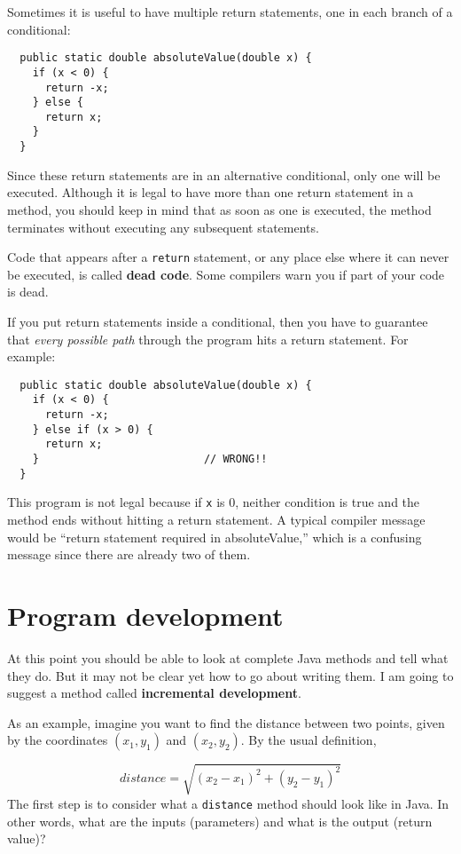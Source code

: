 \documentclass[12pt]{book}
\theoremstyle{definition}
\begin{document}
Sometimes it is useful to have multiple return
statements, one in each branch of a conditional:

\begin{lstlisting}
  public static double absoluteValue(double x) {
    if (x < 0) {
      return -x;
    } else {
      return x;
    }
  }
\end{lstlisting}
%
Since these return statements are in an alternative conditional,
only one will be executed.  Although it is legal to have more than one
return statement in a method, you should keep in mind
that as soon as one is executed, the method
terminates without executing any subsequent statements.

Code that appears after a {\tt return} statement, or any place else
where it can never be executed, is called {\bf dead code}.  Some
compilers warn you if part of your code is dead.


If you put return statements inside a conditional, then
you have to guarantee that {\em every possible path} through
the program hits a return statement.  For example:

\begin{lstlisting}
  public static double absoluteValue(double x) {
    if (x < 0) {
      return -x;
    } else if (x > 0) {
      return x;
    }                          // WRONG!!
  }
\end{lstlisting}
%
This program is not legal because if {\tt x} is 0,
neither condition is true and the method ends without hitting
a return statement.  A typical compiler message would be ``return
statement required in absoluteValue,'' which is a confusing message
since there are already two of them.


\section{Program development}
\label{distance}

At this point you should be able to look at complete Java methods and
tell what they do.  But it may not be clear yet how to go about
writing them.  I am going to suggest a method called {\bf incremental
  development}.

As an example, imagine you want to find the distance between
two points, given by the coordinates $(x_1, y_1)$ and
$(x_2, y_2)$.  By the usual definition,

\begin{equation}
distance = \sqrt{(x_2 - x_1)^2 +(y_2 - y_1)^2}
\end{equation}
%
The first step is to consider what a {\tt distance} method
should look like in Java.  In other words, what are the inputs
(parameters) and what is the output (return value)?
\end{document}
